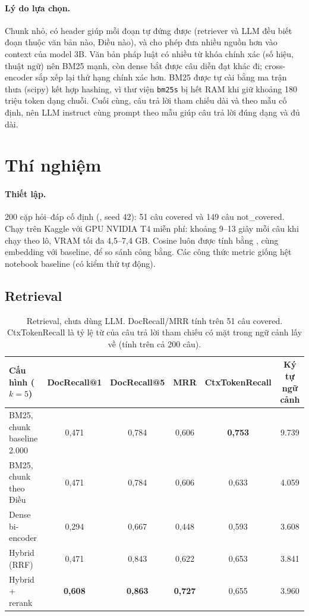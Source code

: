 \documentclass[11pt,a4paper]{article}
\newcommand{\best}[1]{\textbf{#1}}
\newcommand{\file}[1]{\path{#1}}
\begin{document}
\paragraph{Lý do lựa chọn.}
Chunk nhỏ, có header giúp mỗi đoạn tự đứng được (retriever và LLM đều biết đoạn thuộc văn bản nào, Điều nào), và cho phép đưa nhiều nguồn hơn vào context của model 3B.
Văn bản pháp luật có nhiều từ khóa chính xác (số hiệu, thuật ngữ) nên BM25 mạnh, còn dense bắt được câu diễn đạt khác đi; cross-encoder sắp xếp lại thứ hạng chính xác hơn.
BM25 được tự cài bằng ma trận thưa (scipy) kết hợp hashing, vì thư viện \texttt{bm25s} bị hết RAM khi giữ khoảng 180 triệu token dạng chuỗi.
Cuối cùng, câu trả lời tham chiếu dài và theo mẫu cố định, nên LLM instruct cùng prompt theo mẫu giúp câu trả lời đúng dạng và đủ dài.

\section{Thí nghiệm}
\paragraph{Thiết lập.}
200 cặp hỏi--đáp cố định (\file{data/eval_set.csv}, seed 42): 51 câu covered và 149 câu not\_covered.
Chạy trên Kaggle với GPU NVIDIA T4 miễn phí: khoảng 9--13 giây mỗi câu khi chạy theo lô, VRAM tối đa 4{,}5--7{,}4 GB.
Cosine luôn được tính bằng , cùng embedding với baseline, để so sánh công bằng.
Các công thức metric giống hệt notebook baseline (có kiểm thử tự động).

\subsection{Retrieval}
\begin{table}[H]
\centering\small
\caption{Retrieval, chưa dùng LLM. DocRecall/MRR tính trên 51 câu covered. CtxTokenRecall là tỷ lệ từ của câu trả lời tham chiếu có mặt trong ngữ cảnh lấy về (tính trên cả 200 câu).}
\label{tab:retrieval}
\begin{tabular}{@{}lccccc@{}}
\toprule
Cấu hình ($k=5$) & DocRecall@1 & DocRecall@5 & MRR & CtxTokenRecall & Ký tự ngữ cảnh \\
\midrule
BM25, chunk baseline 2.000 & 0{,}471 & 0{,}784 & 0{,}606 & \best{0{,}753} & 9.739 \\
BM25, chunk theo Điều & 0{,}471 & 0{,}784 & 0{,}606 & 0{,}633 & 4.059 \\
Dense bi-encoder & 0{,}294 & 0{,}667 & 0{,}448 & 0{,}593 & 3.608 \\
Hybrid (RRF) & 0{,}471 & 0{,}843 & 0{,}622 & 0{,}653 & 3.841 \\
Hybrid + rerank & \best{0{,}608} & \best{0{,}863} & \best{0{,}727} & 0{,}655 & 3.960 \\
\bottomrule
\end{tabular}
\end{table}
\end{document}
